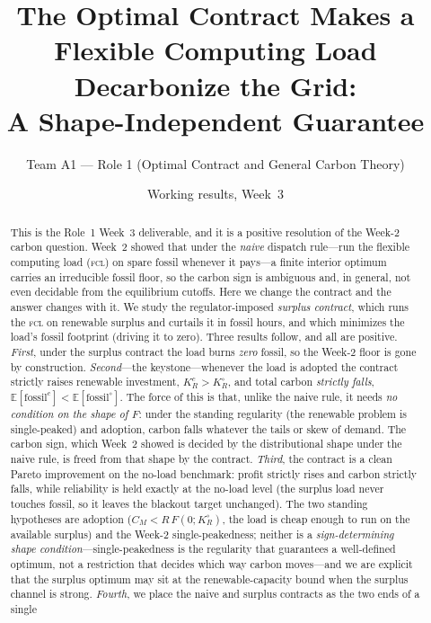 \documentclass[11pt,reqno]{amsart}
\theoremstyle{plain}
\theoremstyle{definition}
\theoremstyle{remark}
\newcommand{\KRc}{K_R^{c}}
\newcommand{\KRo}{K_R^{\circ}}
\newcommand{\CM}{C_M}
\newcommand{\E}{\mathbb{E}}
\newcommand{\fossil}{\mathrm{fossil}}
\begin{document}
\title[The Optimal Contract Makes the Flexible Load Decarbonize (Week 3)]
{The Optimal Contract Makes a Flexible Computing Load Decarbonize the Grid:\\
A Shape-Independent Guarantee}
\author{Team A1 --- Role 1 (Optimal Contract and General Carbon Theory)}
\date{Working results, Week~3}

\begin{abstract}
This is the Role~1 Week~3 deliverable, and it is a positive resolution of the Week-2
carbon question. Week~2 showed that under the \emph{naive} dispatch rule---run the
flexible computing load (\textsc{fcl}) on spare fossil whenever it pays---a finite
interior optimum carries an irreducible fossil floor, so the carbon sign is ambiguous
and, in general, not even decidable from the equilibrium cutoffs. Here we change the
contract and the answer changes with it. We study the regulator-imposed
\emph{surplus contract}, which runs the \textsc{fcl} on renewable surplus and
curtails it in fossil hours, and which minimizes the load's fossil footprint
(driving it to zero). Three results follow, and all are positive. \emph{First}, under
the surplus contract the load burns \emph{zero} fossil, so the Week-2 floor is gone by
construction. \emph{Second}---the keystone---whenever the load is adopted the contract
strictly raises renewable investment, $\KRc>\KRo$, and total carbon \emph{strictly
falls}, $\E[\fossil^{c}]<\E[\fossil^{\circ}]$. The force of this is that, unlike the
naive rule, it needs \emph{no condition on the shape of $F$}: under the standing
regularity (the renewable problem is single-peaked) and adoption, carbon falls whatever
the tails or skew of demand. The carbon sign, which Week~2 showed is decided by the
distributional shape under the naive rule, is freed from that shape by the contract.
\emph{Third}, the contract is a clean Pareto improvement on the no-load benchmark:
profit strictly rises and carbon strictly falls, while reliability is held exactly at
the no-load level (the surplus load never touches fossil, so it leaves the blackout
target unchanged). The two standing hypotheses are adoption ($\CM<R\,F(0;\KRo)$, the
load is cheap enough to run on the available surplus) and the Week-2 single-peakedness;
neither is a \emph{sign-determining shape condition}---single-peakedness is the
regularity that guarantees a well-defined optimum, not a restriction that decides which
way carbon moves---and we are explicit that the surplus optimum may sit at the
renewable-capacity bound when the surplus channel is strong. \emph{Fourth}, we place the naive and surplus contracts as the two ends of a single

\end{abstract}
\end{document}
